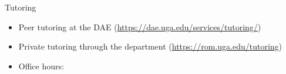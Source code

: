 \documentclass{beamer}
\begin{document}
  \begin{frame}{Tutoring}
    \begin{itemize}
      \item Peer tutoring at the DAE (\url{https://dae.uga.edu/services/tutoring/})
      \item Private tutoring through the department (\url{https://rom.uga.edu/tutoring})
      \item Office hours: 
    \end{itemize}
  \end{frame}
\end{document}
